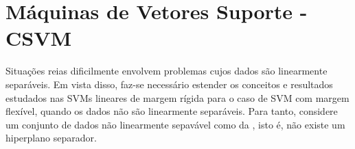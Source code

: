 \documentclass[12pt,a4paper]{scrartcl}
\theoremstyle{definition}%
\begin{document}

\section{Máquinas de Vetores Suporte - CSVM}

Situações reias dificilmente envolvem problemas cujos dados são linearmente separáveis. Em vista disso, faz-se necessário estender os conceitos e resultados estudados nas SVMs lineares de margem rígida para o caso de SVM com margem flexível, quando os dados não são linearmente separáveis. Para tanto, considere um conjunto de dados não linearmente sepavável como da , isto é, não existe um hiperplano separador. 
\end{document}
